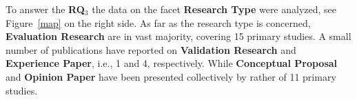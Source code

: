 To answer the \textbf{RQ$_3$} the data on the facet \textbf{Research Type} were analyzed, see Figure~\ref{map} on the right side.
%
As far as the research type is concerned, \textbf{Evaluation Research} are in vast majority, covering 15 primary studies. A small number of publications have reported on \textbf{Validation Research} and \textbf{Experience Paper}, i.e., 1 and 4, respectively. While \textbf{Conceptual Proposal}
 and \textbf{Opinion Paper} have been presented collectively by rather of 11 primary studies.


